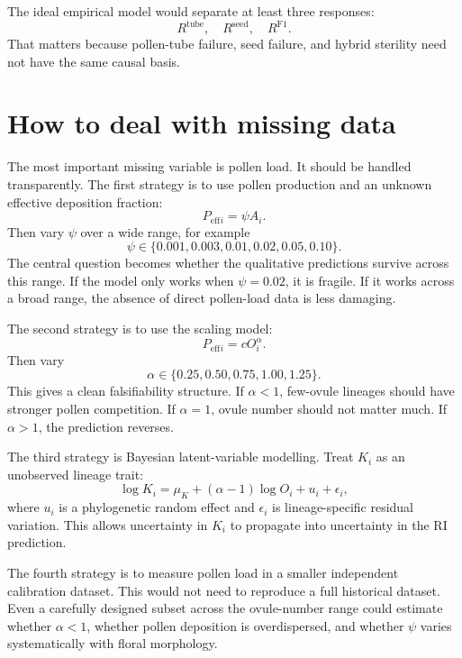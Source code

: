 \documentclass[11pt]{article}
\newcommand{\Peff}{P_{\mathrm{eff}}}
\begin{document}
The ideal empirical model would separate at least three responses:
\begin{equation}
R^{\mathrm{tube}}, \quad R^{\mathrm{seed}}, \quad R^{\mathrm{F1}}.
\end{equation}
That matters because pollen-tube failure, seed failure, and hybrid sterility need not have the same causal basis.

\section{How to deal with missing data}

The most important missing variable is pollen load. It should be handled transparently. The first strategy is to use pollen production and an unknown effective deposition fraction:
\begin{equation}
\Peff{}_{i}=\psi A_i.
\end{equation}
Then vary \(\psi\) over a wide range, for example
\begin{equation}
\psi \in \{0.001,0.003,0.01,0.02,0.05,0.10\}.
\end{equation}
The central question becomes whether the qualitative predictions survive across this range. If the model only works when \(\psi=0.02\), it is fragile. If it works across a broad range, the absence of direct pollen-load data is less damaging.

The second strategy is to use the scaling model:
\begin{equation}
\Peff{}_{i}=cO_i^\alpha.
\end{equation}
Then vary
\begin{equation}
\alpha \in \{0.25,0.50,0.75,1.00,1.25\}.
\end{equation}
This gives a clean falsifiability structure. If \(\alpha<1\), few-ovule lineages should have stronger pollen competition. If \(\alpha=1\), ovule number should not matter much. If \(\alpha>1\), the prediction reverses.

The third strategy is Bayesian latent-variable modelling. Treat \(K_i\) as an unobserved lineage trait:
\begin{equation}
\log K_i = \mu_K + (\alpha-1)\log O_i + u_i + \epsilon_i,
\label{eq:latent_K}
\end{equation}
where \(u_i\) is a phylogenetic random effect and \(\epsilon_i\) is lineage-specific residual variation. This allows uncertainty in \(K_i\) to propagate into uncertainty in the RI prediction.

The fourth strategy is to measure pollen load in a smaller independent calibration dataset. This would not need to reproduce a full historical dataset. Even a carefully designed subset across the ovule-number range could estimate whether \(\alpha<1\), whether pollen deposition is overdispersed, and whether \(\psi\) varies systematically with floral morphology.
\end{document}
